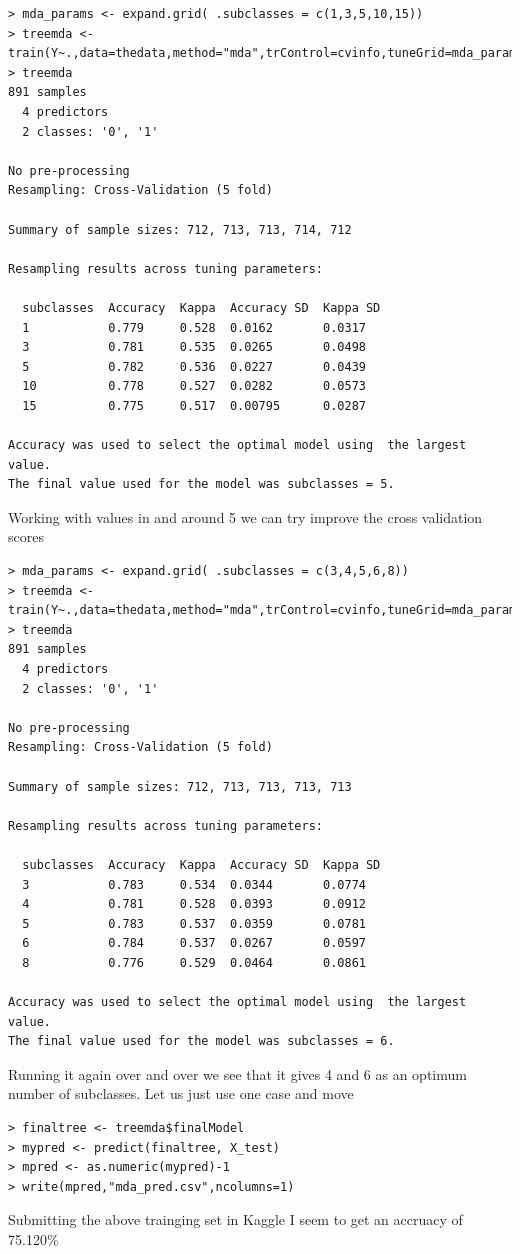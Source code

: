 \documentclass[fontsize=10pt]{scrartcl}
\begin{document}
\begin{enumerate}
\begin{verbatim}
> mda_params <- expand.grid( .subclasses = c(1,3,5,10,15))
> treemda <-train(Y~.,data=thedata,method="mda",trControl=cvinfo,tuneGrid=mda_params)
> treemda
891 samples
  4 predictors
  2 classes: '0', '1' 

No pre-processing
Resampling: Cross-Validation (5 fold) 

Summary of sample sizes: 712, 713, 713, 714, 712 

Resampling results across tuning parameters:

  subclasses  Accuracy  Kappa  Accuracy SD  Kappa SD
  1           0.779     0.528  0.0162       0.0317  
  3           0.781     0.535  0.0265       0.0498  
  5           0.782     0.536  0.0227       0.0439  
  10          0.778     0.527  0.0282       0.0573  
  15          0.775     0.517  0.00795      0.0287  

Accuracy was used to select the optimal model using  the largest value.
The final value used for the model was subclasses = 5. 
\end{verbatim}
			Working with values in and around 5 we can try improve the cross validation scores

\begin{verbatim}
> mda_params <- expand.grid( .subclasses = c(3,4,5,6,8))
> treemda <-train(Y~.,data=thedata,method="mda",trControl=cvinfo,tuneGrid=mda_params)
> treemda
891 samples
  4 predictors
  2 classes: '0', '1' 

No pre-processing
Resampling: Cross-Validation (5 fold) 

Summary of sample sizes: 712, 713, 713, 713, 713 

Resampling results across tuning parameters:

  subclasses  Accuracy  Kappa  Accuracy SD  Kappa SD
  3           0.783     0.534  0.0344       0.0774  
  4           0.781     0.528  0.0393       0.0912  
  5           0.783     0.537  0.0359       0.0781  
  6           0.784     0.537  0.0267       0.0597  
  8           0.776     0.529  0.0464       0.0861  

Accuracy was used to select the optimal model using  the largest value.
The final value used for the model was subclasses = 6. 
\end{verbatim}

		Running it again over and over we see that it gives 4 and 6 as an optimum number of subclasses. Let us just use one case and move
\begin{verbatim}
> finaltree <- treemda$finalModel
> mypred <- predict(finaltree, X_test)
> mpred <- as.numeric(mypred)-1
> write(mpred,"mda_pred.csv",ncolumns=1)
\end{verbatim}
			Submitting the above trainging set in Kaggle I seem to get an accruacy of 75.120\%


\end{enumerate}
\end{document}
